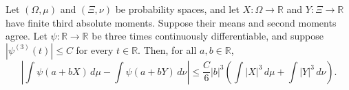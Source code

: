 \begin{theorem}
\label{BooleanAnalysis.GaussianSpace.affine_replacement_bound_c3}
\leanok
{}
Let $(\Omega,\mu)$ and $(\Xi,\nu)$ be probability spaces, and let
$X\colon\Omega\to\mathbb R$ and $Y\colon\Xi\to\mathbb R$ have finite third absolute
moments. Suppose their means and second moments agree. Let $\psi\colon\mathbb
R\to\mathbb R$ be three times continuously differentiable, and suppose
$|\psi^{(3)}(t)|\le C$ for every $t\in\mathbb R$. Then, for all $a,b\in\mathbb R$,
\[
\left|\int \psi(a+bX)\,d\mu-\int \psi(a+bY)\,d\nu\right|
\le \frac C6 |b|^3\left(\int |X|^3\,d\mu+\int |Y|^3\,d\nu\right).
\]
\end{theorem}
